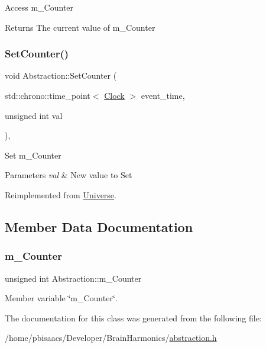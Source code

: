 Access m\+\_\+\+Counter \begin{DoxyReturn}{Returns}
The current value of m\+\_\+\+Counter 
\end{DoxyReturn}
\mbox{\label{classAbstraction_a82cd32bf3de41f35ab76d80611fe6763}} 
\subsubsection{\texorpdfstring{Set\+Counter()}{SetCounter()}}
{\footnotesize\ttfamily void Abstraction\+::\+Set\+Counter (\begin{DoxyParamCaption}\item[{std\+::chrono\+::time\+\_\+point$<$ \mbox{\hyperlink{universe_8h_a0ef8d951d1ca5ab3cfaf7ab4c7a6fd80}{Clock}} $>$}]{event\+\_\+time,  }\item[{unsigned int}]{val }\end{DoxyParamCaption})\hspace{0.3cm}{\ttfamily [inline]}, {\ttfamily [virtual]}}

Set m\+\_\+\+Counter 
\begin{DoxyParams}{Parameters}
{\em val} & New value to Set \\
\hline
\end{DoxyParams}


Reimplemented from \mbox{\hyperlink{classUniverse_aa22202ae740eb1355529afcb13285e91}{Universe}}.



\subsection{Member Data Documentation}
\mbox{\label{classAbstraction_a6144b0e382f72ad170a238d6ed4a0486}} 
\subsubsection{\texorpdfstring{m\+\_\+\+Counter}{m\_Counter}}
{\footnotesize\ttfamily unsigned int Abstraction\+::m\+\_\+\+Counter\hspace{0.3cm}{\ttfamily [private]}}



Member variable \char`\"{}m\+\_\+\+Counter\char`\"{}. 



The documentation for this class was generated from the following file\+:\begin{DoxyCompactItemize}
\item 
/home/pbisaacs/\+Developer/\+Brain\+Harmonics/\mbox{\hyperlink{abstraction_8h}{abstraction.\+h}}\end{DoxyCompactItemize}
